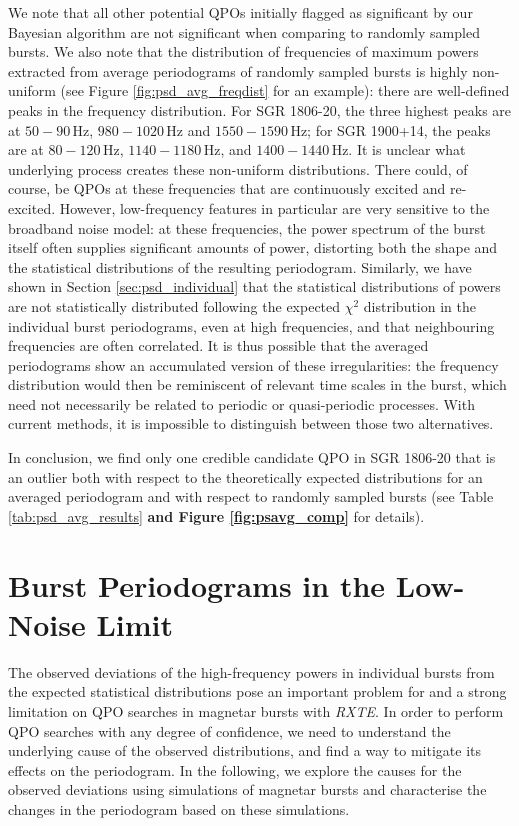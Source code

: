 \documentclass[numberedappendix]{emulateapj}
\newcommand{\hz}{\,\mathrm{Hz}}
\newcommand{\project}[1]{\textsl{#1}}
\newcommand{\rxte}{\project{RXTE}}
\begin{document}
We note that all other potential QPOs initially flagged as significant by our Bayesian algorithm are not significant when comparing to randomly sampled bursts. We also note that the distribution of frequencies of maximum powers extracted from average periodograms of randomly sampled bursts is highly non-uniform (see Figure \ref{fig:psd_avg_freqdist} for an example): there are well-defined peaks in the frequency distribution. For SGR 1806-20, the three highest peaks are at $50 - 90 \hz$, $980 - 1020 \hz$ and $1550 - 1590 \hz$; for SGR 1900+14, the peaks are at $80 - 120 \hz$, $1140 - 1180 \hz$, and $1400 - 1440 \hz$. It is unclear what underlying process creates these non-uniform distributions. There could, of course, be QPOs at these frequencies that are continuously excited and re-excited. However, low-frequency features in particular are very sensitive to the broadband noise model: at these frequencies, the power spectrum of the burst itself often supplies significant amounts of power, distorting both the shape and the statistical distributions of the resulting periodogram. Similarly, we have shown in Section \ref{sec:psd_individual} that the statistical distributions of powers are not statistically distributed following the expected $\chi^2$ distribution in the individual burst periodograms, even at high frequencies, and that neighbouring frequencies are often correlated. It is thus possible that the averaged periodograms show an accumulated version of these irregularities: the frequency distribution would then be reminiscent of relevant time scales in the burst, which need not necessarily be related to periodic or quasi-periodic processes. With current methods, it is impossible to distinguish between those two alternatives.

In conclusion, we find only one credible candidate QPO in SGR 1806-20 that is an outlier both with respect to the theoretically expected distributions for an averaged periodogram and with respect to randomly sampled bursts (see Table \ref{tab:psd_avg_results} \textbf{and Figure \ref{fig:psavg_comp}} for details).


\section{Burst Periodograms in the Low-Noise Limit}
\label{sec:weakbursts}

The observed deviations of the high-frequency powers in individual bursts from the expected statistical distributions pose an important problem for and a strong limitation on QPO searches in magnetar bursts with \rxte. In order to perform QPO searches with any degree of confidence, we need to understand the underlying cause of the observed distributions, and find a way to mitigate its effects on the periodogram. In the following, we explore the causes for the observed deviations using simulations of magnetar bursts and characterise the changes in the periodogram based on these simulations. 
\end{document}
